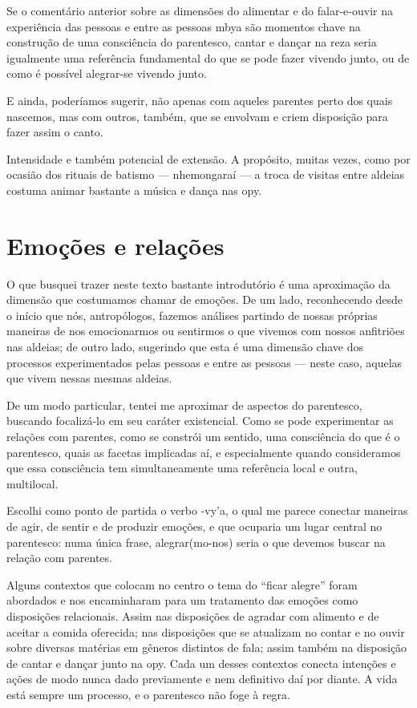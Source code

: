 Se o comentário anterior sobre as dimensões do alimentar e do
falar-e-ouvir na experiência das pessoas e entre as pessoas mbya são
momentos chave na construção de uma consciência do parentesco, cantar e
dançar na reza seria igualmente uma referência fundamental do que se
pode fazer vivendo junto, ou de como é possível alegrar-se vivendo
junto.

E ainda, poderíamos sugerir, não apenas com aqueles parentes perto dos
quais nascemos, mas com outros, também, que se envolvam e criem
disposição para fazer assim o canto.

Intensidade e também potencial de extensão. A propósito, muitas vezes,
como por ocasião dos rituais de batismo --- nhemongaraí --- a troca de
visitas entre aldeias costuma animar bastante a música e dança nas opy.

\section{Emoções e relações}

O que busquei trazer neste texto bastante introdutório é uma aproximação
da dimensão que costumamos chamar de emoções. De um lado, reconhecendo
desde o início que nós, antropólogos, fazemos análises partindo de
nossas próprias maneiras de nos emocionarmos ou sentirmos o que vivemos
com nossos anfitriões nas aldeias; de outro lado, sugerindo que esta é
uma dimensão chave dos processos experimentados pelas pessoas e entre
as pessoas --- neste caso, aquelas que vivem nessas mesmas aldeias.

De um modo particular, tentei me aproximar de aspectos do parentesco,
buscando focalizá-lo em seu caráter existencial. Como se pode
experimentar as relações com parentes, como se constrói um sentido, uma
consciência do que é o parentesco, quais as facetas implicadas aí, e
especialmente quando consideramos que essa consciência tem
simultaneamente uma referência local e outra, multilocal.

Escolhi como ponto de partida o verbo -vy’a, o qual me parece conectar
maneiras de agir, de sentir e de produzir emoções, e que ocuparia um
lugar central no parentesco: numa única frase, alegrar(mo-nos) seria o
que devemos buscar na relação com parentes. 

Alguns contextos que colocam no centro o tema do ``ficar alegre'' foram
abordados e nos encaminharam para um tratamento das emoções como
disposições relacionais. Assim nas disposições de agradar com alimento
e de aceitar a comida oferecida; nas disposições que se atualizam no
contar e no ouvir sobre diversas matérias em gêneros distintos de fala;
assim também na disposição de cantar e dançar junto na opy. Cada um
desses contextos conecta intenções e ações de modo nunca dado
previamente e nem definitivo daí por diante. A vida está sempre um
processo, e o parentesco não foge à regra.


